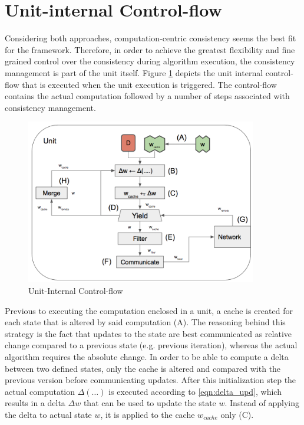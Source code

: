\section{Unit-internal Control-flow}
Considering both approaches, computation-centric consistency seems the best fit for the framework.
Therefore, in order to achieve the greatest flexibility and fine grained control over the consistency during algorithm execution, the consistency management is part of the unit itself.
Figure \ref{fig:unit_internal_flow} depicts the unit internal control-flow that is executed when the unit execution is triggered.
The control-flow contains the actual computation followed by a number of steps associated with consistency management.
\begin{figure}[ht]
\centering
\includegraphics[width=0.9\textwidth]{img/unit_internal_flow.png}
\caption{Unit-Internal Control-flow}
\label{fig:unit_internal_flow}
\end{figure}
Previous to executing the computation enclosed in a unit, a cache is created for each state that is altered by said computation (A).
The reasoning behind this strategy is the fact that updates to the state are best communicated as relative change compared to a previous state (e.g. previous iteration), whereas the actual algorithm requires the absolute change.
In order to be able to compute a delta between two defined states, only the cache is altered and compared with the previous version before communicating updates.
After this initialization step the actual computation $\Delta(\ldots)$ is executed according to \eqref{eqn:delta_upd}, which results in a delta $\Delta w$ that can be used to update the state $w$.
Instead of applying the delta to actual state $w$, it is applied to the cache $w_{cache}$ only (C).
